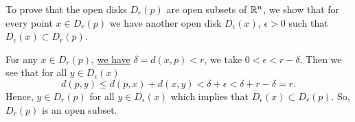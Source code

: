 
\begin{solution}
    To prove that the open disks $D_r(p)$
  are open subsets of $\mathbb{R}^n$, we show that
  for every point $x\in D_r(p)$ we have another
  open disk $D_{\epsilon}(x)$, $\epsilon>0$ such that
  $D_{\epsilon}(x)\subset D_r(p)$.

  \setlength{\parskip}{3mm}
  For any $x\in D_r(p)$, \underline{we have} $\delta=d(x,p)<r$,
  we take $0<\epsilon<r-\delta$. Then we see that
  for all $y\in D_{\epsilon}(x)$
  $$d(p,y)\leq d(p,x)+d(x,y)<\delta+\epsilon<
  \delta+r-\delta=r.$$
  Hence, $y\in D_r(p)$ for all $y\in D_{\epsilon}(x)$
  which implies that $D_{\epsilon}(x)\subset D_r(p)$.
  So, $D_r(p)$ is an open subset.
\end{solution}